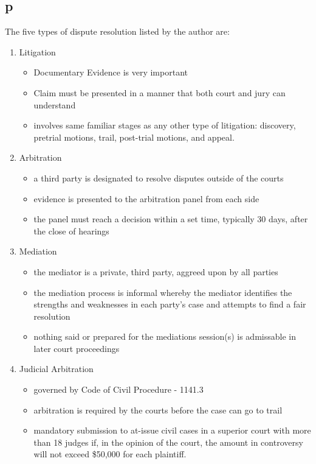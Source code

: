 \documentclass[12pt]{article} %
\begin{document}
	\subsection{p}
		The five types of dispute resolution listed by the author are:
			\begin{enumerate}
				\item Litigation
					\begin{itemize}
						\item Documentary Evidence is very important
						\item Claim must be presented in a manner that both court and jury can understand
						\item involves same familiar stages as any other type of litigation: discovery, pretrial motions, trail, post-trial motions, and appeal.
					\end{itemize}
				\item Arbitration
					\begin{itemize}
						\item a third party is designated to resolve disputes outside of the courts
						\item evidence is presented to the arbitration panel from each side
						\item the panel must reach a decision within a set time, typically 30 days, after the close of hearings
					\end{itemize}
				\item Mediation
					\begin{itemize}
						\item the mediator is a private, third party, aggreed upon by all parties
						\item the mediation process is informal whereby the mediator identifies the strengths and weaknesses in each party's case and attempts to find a fair resolution
						\item nothing said or prepared for the mediations session(s) is admissable in later court proceedings
					\end{itemize}
				\item Judicial Arbitration
					\begin{itemize}
						\item governed by Code of Civil Procedure  - 1141.3
						\item arbitration is required by the courts before the case can go to trail
						\item mandatory submission to at-issue civil cases in a superior court with more than 18 judges if, in the opinion of the court, the amount in controversy will not exceed \$50,000 for each plaintiff.

\end{itemize}
\end{enumerate}
\end{document}
